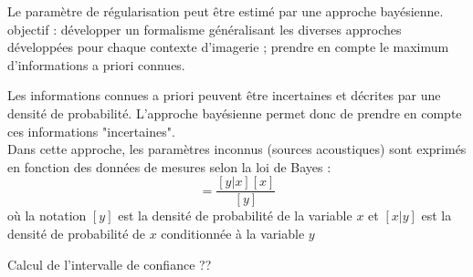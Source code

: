 Le paramètre de régularisation peut être estimé par une approche bayésienne. 
objectif : développer un formalisme généralisant les diverses approches développées pour chaque contexte d'imagerie ; prendre en compte le maximum d'informations a priori connues.

Les informations connues a priori peuvent être incertaines et décrites par une densité de probabilité. L'approche bayésienne permet donc de prendre en compte ces informations "incertaines".\\
Dans cette approche, les paramètres inconnus (sources acoustiques) sont exprimés en fonction des données de mesures selon la loi de Bayes : 
\begin{equation}
[x|y] = \frac{[y|x][x]}{[y]}
\end{equation}
où la notation $[y]$ est la densité de probabilité de la variable $x$ et $[x|y]$ est la densité de probabilité de $x$ conditionnée à la variable $y$





Calcul de l'intervalle de confiance ??
	
